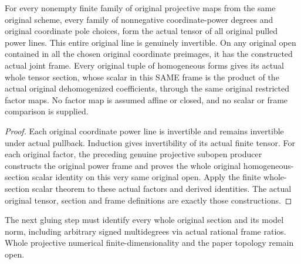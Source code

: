 \begin{theorem}\label{thm:finite-original-projective-power-joint-frames}
\leanok
{}
For every nonempty finite family of original projective maps from the same original scheme, every family of nonnegative coordinate-power degrees and original coordinate pole choices, form the actual tensor of all original pulled power lines. This entire original line is genuinely invertible. On any original open contained in all the chosen original coordinate preimages, it has the constructed actual joint frame. Every original tuple of homogeneous forms gives its actual whole tensor section, whose scalar in this SAME frame is the product of the actual original dehomogenized coefficients, through the same original restricted factor maps. No factor map is assumed affine or closed, and no scalar or frame comparison is supplied.
\end{theorem}
\begin{proof}
Each original coordinate power line is invertible and remains invertible under actual pullback. Induction gives invertibility of its actual finite tensor. For each original factor, the preceding genuine projective subopen producer constructs the original power frame and proves the whole original homogeneous-section scalar identity on this very same original open. Apply the finite whole-section scalar theorem to these actual factors and derived identities. The actual original tensor, section and frame definitions are exactly those constructions.
\end{proof}
The next gluing step must identify every whole original section and its model norm, including arbitrary signed multidegrees via actual rational frame ratios. Whole projective numerical finite-dimensionality and the paper topology remain open.
